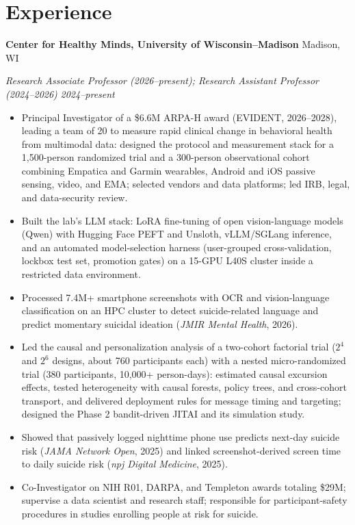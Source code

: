 \documentclass[10pt,letterpaper]{article}
\newcommand{\org}[2]{\textbf{#1} \hfill #2\par}
\newcommand{\role}[2]{\textit{#1} \hfill \textit{#2}\par\vspace{1pt}}
\begin{document}
\section{Experience}
\org{Center for Healthy Minds, University of Wisconsin--Madison}{Madison, WI}
\role{Research Associate Professor (2026--present); Research Assistant Professor (2024--2026)}{2024--present}
\begin{itemize}
\item Principal Investigator of a \$6.6M ARPA-H award (EVIDENT, 2026--2028), leading a team of 20 to measure rapid clinical change in behavioral health from multimodal data: designed the protocol and measurement stack for a 1,500-person randomized trial and a 300-person observational cohort combining Empatica and Garmin wearables, Android and iOS passive sensing, video, and EMA; selected vendors and data platforms; led IRB, legal, and data-security review.
\item Built the lab's LLM stack: LoRA fine-tuning of open vision-language models (Qwen) with Hugging Face PEFT and Unsloth, vLLM/SGLang inference, and an automated model-selection harness (user-grouped cross-validation, lockbox test set, promotion gates) on a 15-GPU L40S cluster inside a restricted data environment.
\item Processed 7.4M+ smartphone screenshots with OCR and vision-language classification on an HPC cluster to detect suicide-related language and predict momentary suicidal ideation (\textit{JMIR Mental Health}, 2026).
\item Led the causal and personalization analysis of a two-cohort factorial trial ($2^4$ and $2^6$ designs, about 760 participants each) with a nested micro-randomized trial (380 participants, 10,000+ person-days): estimated causal excursion effects, tested heterogeneity with causal forests, policy trees, and cross-cohort transport, and delivered deployment rules for message timing and targeting; designed the Phase 2 bandit-driven JITAI and its simulation study.
\item Showed that passively logged nighttime phone use predicts next-day suicide risk (\textit{JAMA Network Open}, 2025) and linked screenshot-derived screen time to daily suicide risk (\textit{npj Digital Medicine}, 2025).
\item Co-Investigator on NIH R01, DARPA, and Templeton awards totaling \$29M; supervise a data scientist and research staff; responsible for participant-safety procedures in studies enrolling people at risk for suicide.
\end{itemize}
\end{document}
